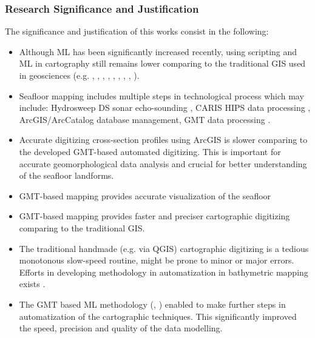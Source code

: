 \documentclass[pdflatex,compress,8pt,
	xcolor={dvipsnames,svgnames,x11names,table},
	hyperref={colorlinks = true,breaklinks = true, urlcolor = NavyBlue}]{beamer}
\begin{document}
\begin{frame}\frametitle{Research Significance and Justification}
The significance and justification of this works consist in the following:

\begin{itemize}
         \item Although ML has been significantly increased recently, using scripting and ML in cartography still remains lower comparing to the traditional GIS used in geosciences (e.g. \cite{Lemenkova2005b2}, \cite{RID09251802355041}, \cite{RID:0925180235504-2}, \cite{Lemenkova2014d}, \cite{Lemenkova2011c}, \cite{Lemenkova2005a}, \cite{Lemenkova2012j}, \cite{Lemenkova2012d}, \cite{Lemenkova2012g}). 
         \item Seafloor mapping includes multiple steps in technological process which may include: Hydrosweep DS sonar echo-sounding \cite{Lemenkova201569}, CARIS HIPS data processing \cite{Lemenkova2007f}, ArcGIS/ArcCatalog database management, GMT data processing \cite{Lemenkova201565}. 
	\item Accurate digitizing cross-section profiles using ArcGIS is slower comparing to the developed GMT-based automated digitizing. This is important for accurate geomorphological data analysis and crucial for better understanding of the seafloor landforms. 
	\item GMT-based mapping provides accurate visualization of the seafloor \cite{Lemenkova2007f}
	\item GMT-based mapping provides faster and preciser cartographic digitizing comparing to the traditional GIS. 
	\item The traditional handmade (e.g. via QGIS) cartographic digitizing is a tedious monotonous slow-speed routine, might be prone to minor or major errors. Efforts in developing methodology in automatization in bathymetric mapping exists \cite{Lemenkova2008b}. 
	\item The GMT based ML methodology (\cite{Wessel2019}, \cite{Wessel2018}) enabled to make further steps in automatization of the cartographic techniques. This significantly improved the speed, precision and quality of the data modelling.	
\end{itemize}

\end{frame}
\end{document}
